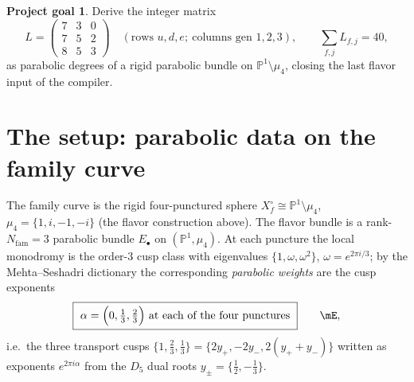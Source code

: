 \documentclass[11pt,a4paper]{article}
\newcommand{\Nfam}{N_{\mathrm{fam}}}
\theoremstyle{definition}
\newtheorem*{goal}{Project goal}
\begin{document}
\begin{goal}
Derive the integer matrix
\[
  L=\begin{pmatrix}7&3&0\\7&5&2\\8&5&3\end{pmatrix}
  \quad(\text{rows }u,d,e;\ \text{columns gen }1,2,3),\qquad \sum_{f,j}L_{f,j}=40 ,
\]
as parabolic degrees of a rigid parabolic bundle on $\mathbb P^1\setminus\mu_4$, closing the last
flavor input of the compiler.
\end{goal}

\section{The setup: parabolic data on the family curve}
The family curve is the rigid four-punctured sphere $X_f^\circ\cong\mathbb P^1\setminus\mu_4$,
$\mu_4=\{1,i,-1,-i\}$ (the flavor construction above). The flavor bundle is a rank-$\Nfam=3$ parabolic bundle $E_\bullet$ on
$(\mathbb P^1,\mu_4)$. At each puncture the local monodromy is the order-$3$ cusp class with eigenvalues
$\{1,\omega,\omega^2\}$, $\omega=e^{2\pi i/3}$; by the Mehta--Seshadri dictionary the corresponding
\emph{parabolic weights} are the cusp exponents
\begin{equation}
  \boxed{\ \alpha=\Bigl(0,\tfrac13,\tfrac23\Bigr)\ \text{at each of the four punctures}\ }\qquad\mE ,
\end{equation}
i.e.\ the three transport cusps $\{1,\tfrac23,\tfrac13\}=\{2y_+,-2y_-,2(y_++y_-)\}$ written as
exponents $e^{2\pi i\alpha}$ from the $D_5$ dual roots $y_\pm=\{\tfrac12,-\tfrac13\}$.
\end{document}
